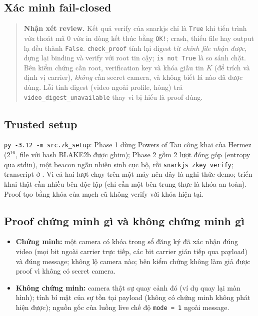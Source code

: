 \documentclass[10pt,a4paper]{article}
\newcommand{\srcpy}[3]{}
\newcommand{\review}[1]{\begin{quote}\colorbox{ReviewBg}{\parbox{0.94\linewidth}{\textbf{Nhận xét review.} #1}}\end{quote}}
\begin{document}
\subsection{Xác minh fail-closed}

\srcpy{src/zk_proof.py}{326}{343}

\srcpy{src/camera_proof.py}{114}{134}

\review{Kết quả verify của snarkjs chỉ là \texttt{True} khi tiến trình \emph{vừa} thoát mã 0 \emph{vừa} in dòng kết thúc bằng \texttt{OK!}; crash, thiếu file hay output lạ đều thành \texttt{False}. \texttt{check\_proof} tính lại digest từ \emph{chính file nhận được}, dựng lại binding và verify với root tin cậy; \texttt{is not True} là so sánh chặt. Bên kiểm chứng cần root, verification key và khóa giấu tin $K$ (để trích và định vị carrier), \emph{không} cần secret camera, và không biết lá nào đã được dùng. Lỗi tính digest (video ngoài profile, hỏng) trả \texttt{video\_digest\_unavailable} thay vì bị hiểu là proof đúng.}

\subsection{Trusted setup}

\texttt{py -3.12 -m src.zk\_setup}: Phase 1 dùng Powers of Tau công khai của Hermez ($2^{16}$, file  với hash BLAKE2b được ghim); Phase 2 gồm 2 lượt đóng góp (entropy qua stdin), một beacon ngẫu nhiên sinh cục bộ, rồi \texttt{snarkjs zkey verify}; transcript ở . Vì cả hai lượt chạy trên một máy nên đây là nghi thức demo; triển khai thật cần nhiều bên độc lập (chỉ cần một bên trung thực là khóa an toàn). Proof tạo bằng khóa của mạch cũ không verify với khóa hiện tại.

\subsection{Proof chứng minh gì và không chứng minh gì}

\begin{itemize}
  \item \textbf{Chứng minh:} một camera có khóa trong sổ đăng ký đã xác nhận đúng video (mọi bit ngoài carrier trực tiếp, các bit carrier gián tiếp qua payload) và đúng message; không lộ camera nào; bên kiểm chứng không làm giả được proof vì không có secret camera.
  \item \textbf{Không chứng minh:} camera thật sự quay cảnh đó (ví dụ quay lại màn hình); tính bí mật của sự tồn tại payload (không có chứng minh không phát hiện được); nguồn gốc của luồng live chế độ \texttt{mode = 1} ngoài message.
\end{itemize}
\end{document}
